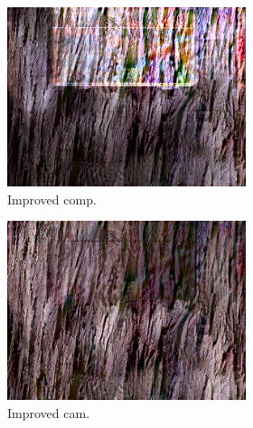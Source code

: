 \begin{figure}[]
\begin{subfigure}{\textwidth}
        \begin{subfigure}{0.24\textwidth}
            \centering
            \includegraphics[width=\textwidth]{images/04-experiment02/carpet/wood/improved_im.jpg}
            \caption*{Improved comp.}
        \end{subfigure}
        \hfill
        \begin{subfigure}{0.24\textwidth}
            \centering
            \includegraphics[width=\textwidth]{images/04-experiment02/carpet/wood/improved_proj.jpg}
            \caption*{Improved cam.}
        \end{subfigure}
        \hfill
        \begin{subfigure}{0.24\textwidth}
            \centering

\end{subfigure}
\end{subfigure}
\end{figure}
